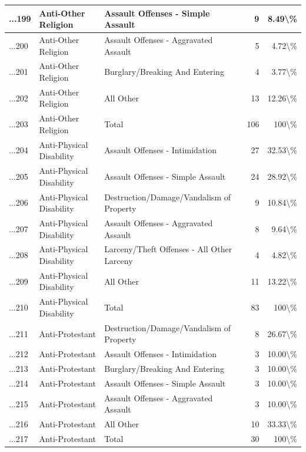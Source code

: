 \documentclass[
]{krantz}
\begin{document}
\begin{longtable}[t]{l|l|l|r|r}
\hline
...199 & Anti-Other Religion & Assault Offenses - Simple Assault & 9 & 8.49\textbackslash{}\%\\
\hline
...200 & Anti-Other Religion & Assault Offenses - Aggravated Assault & 5 & 4.72\textbackslash{}\%\\
\hline
...201 & Anti-Other Religion & Burglary/Breaking And Entering & 4 & 3.77\textbackslash{}\%\\
\hline
...202 & Anti-Other Religion & All Other & 13 & 12.26\textbackslash{}\%\\
\hline
...203 & Anti-Other Religion & Total & 106 & 100\textbackslash{}\%\\
\hline
...204 & Anti-Physical Disability & Assault Offenses - Intimidation & 27 & 32.53\textbackslash{}\%\\
\hline
...205 & Anti-Physical Disability & Assault Offenses - Simple Assault & 24 & 28.92\textbackslash{}\%\\
\hline
...206 & Anti-Physical Disability & Destruction/Damage/Vandalism of Property & 9 & 10.84\textbackslash{}\%\\
\hline
...207 & Anti-Physical Disability & Assault Offenses - Aggravated Assault & 8 & 9.64\textbackslash{}\%\\
\hline
...208 & Anti-Physical Disability & Larceny/Theft Offenses - All Other Larceny & 4 & 4.82\textbackslash{}\%\\
\hline
...209 & Anti-Physical Disability & All Other & 11 & 13.22\textbackslash{}\%\\
\hline
...210 & Anti-Physical Disability & Total & 83 & 100\textbackslash{}\%\\
\hline
...211 & Anti-Protestant & Destruction/Damage/Vandalism of Property & 8 & 26.67\textbackslash{}\%\\
\hline
...212 & Anti-Protestant & Assault Offenses - Intimidation & 3 & 10.00\textbackslash{}\%\\
\hline
...213 & Anti-Protestant & Burglary/Breaking And Entering & 3 & 10.00\textbackslash{}\%\\
\hline
...214 & Anti-Protestant & Assault Offenses - Simple Assault & 3 & 10.00\textbackslash{}\%\\
\hline
...215 & Anti-Protestant & Assault Offenses - Aggravated Assault & 3 & 10.00\textbackslash{}\%\\
\hline
...216 & Anti-Protestant & All Other & 10 & 33.33\textbackslash{}\%\\
\hline
...217 & Anti-Protestant & Total & 30 & 100\textbackslash{}\%\\

\end{longtable}
\end{document}
